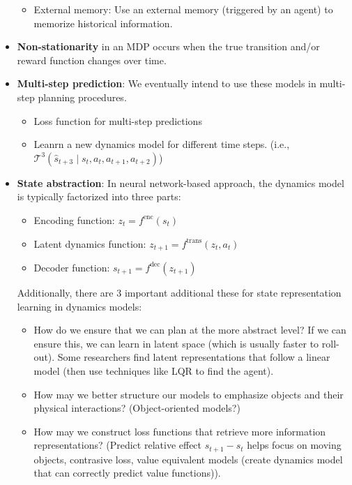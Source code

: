 \documentclass{article}
\theoremstyle{plain}
\begin{document}
\begin{itemize}
\begin{itemize}[nolistsep]
            \item External memory: Use an external memory (triggered by an agent) to memorize historical information.
        \end{itemize}
    \item \textbf{Non-stationarity} in an MDP occurs when the true transition and/or reward function changes over time.
    \item \textbf{Multi-step prediction}: We eventually intend to use these models in multi-step planning procedures. 
        \begin{itemize}[nolistsep]
            \item Loss function for multi-step predictions
            \item Leanrn a new dynamics model for different time steps. (i.e., $\mathcal{T}^3(\hat{s}_{t+3} \mid s_t, a_t, a_{t+1}, a_{t+2})$)
        \end{itemize}
    \item \textbf{State abstraction}: In neural network-based approach, the dynamics model is typically factorized into three parts:
        \begin{itemize}[nolistsep]
            \item Encoding function: $z_t = f^{\text{enc}}(s_t)$
            \item Latent dynamics function: $z_{t+1} = f^{\text{trans}}(z_t, a_t)$
            \item Decoder function: $s_{t+1} = f^{\text{dec}}(z_{t+1})$
        \end{itemize}
    Additionally, there are 3 important additional these for state representation learning in dynamics models:
        \begin{itemize}[nolistsep]
            \item How do we ensure that we can plan at the more abstract level? If we can ensure this, we can learn in latent space (which is usually faster to roll-out). Some researchers find latent representations that follow a linear model (then use techniques like LQR to find the agent).
            \item How may we better structure our models to emphasize objects and their physical interactions? (Object-oriented models?)
            \item How may we construct loss functions that retrieve more information representations? (Predict relative effect $s_{t+1} - s_t$ helps focus on moving objects, contrasive loss, value equivalent models (create dynamics model that can correctly predict value functions)).

\end{itemize}
\end{itemize}
\end{document}
